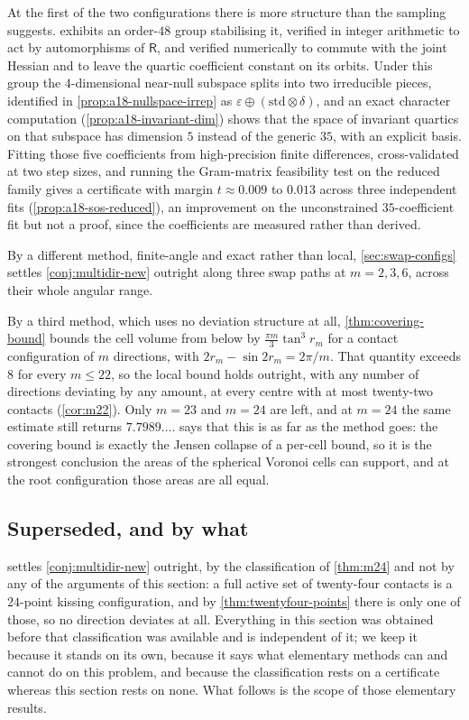\documentclass[11pt,reqno]{amsart}
\renewcommand{\_}{\origunderscore\allowbreak}
\numberwithin{equation}{section}
\theoremstyle{plain}
\theoremstyle{definition}
\theoremstyle{remark}
\newcommand{\Rt}{\mathsf{R}}                 %
\begin{document}
At the first of the two configurations there is more structure than the
sampling suggests.  exhibits an order-$48$
group stabilising it, verified in integer arithmetic to act by
automorphisms of $\Rt$, and verified numerically to commute with the
joint Hessian and to leave the quartic coefficient constant on its
orbits. Under this group the $4$-dimensional near-null subspace splits
into two irreducible pieces, identified in
\cref{prop:a18-nullspace-irrep} as
$\varepsilon\oplus(\mathrm{std}\otimes\delta)$, and an exact character
computation (\cref{prop:a18-invariant-dim}) shows that the space of
invariant quartics on that subspace has dimension $5$ instead of the generic $35$, with an explicit basis. Fitting those five coefficients
from high-precision finite differences, cross-validated at two step
sizes, and running the Gram-matrix feasibility test on the reduced
family gives a certificate with margin $t\approx0.009$ to $0.013$ across
three independent fits (\cref{prop:a18-sos-reduced}), an improvement on
the unconstrained $35$-coefficient fit but not a proof, since the
coefficients are measured rather than derived.

By a different method, finite-angle and exact rather than local,
\cref{sec:swap-configs} settles \cref{conj:multidir-new} outright along
three swap paths at $m=2,3,6$, across their whole angular range.

By a third method, which uses no deviation structure at all,
\cref{thm:covering-bound} bounds the cell volume from below by
$\tfrac{\pi m}{3}\tan^3r_m$ for a contact configuration of $m$
directions, with $2r_m-\sin2r_m=2\pi/m$. That quantity exceeds $8$ for
every $m\le22$, so the local bound holds outright, with any number of
directions deviating by any amount, at every centre with at most
twenty-two contacts (\cref{cor:m22}). Only $m=23$ and $m=24$ are left,
and at $m=24$ the same estimate still returns $7.7989\ldots$.
 says that this is as far as the method goes:
the covering bound is exactly the Jensen collapse of a per-cell bound,
so it is the strongest conclusion the areas of the spherical Voronoi
cells can support, and at the root configuration those areas are all
equal.

\subsection{Superseded, and by what}

 settles \cref{conj:multidir-new} outright, by
the classification of \cref{thm:m24} and not by any of the arguments of
this section: a full active set of twenty-four contacts is a $24$-point
kissing configuration, and by \cref{thm:twentyfour-points} there is only
one of those, so no direction deviates at all. Everything in this
section was obtained before that classification was available and is
independent of it; we keep it because it stands on its own, because it
says what elementary methods can and cannot do on this problem, and
because the classification rests on a certificate whereas this section
rests on none. What follows is the scope of those elementary results.
\end{document}
